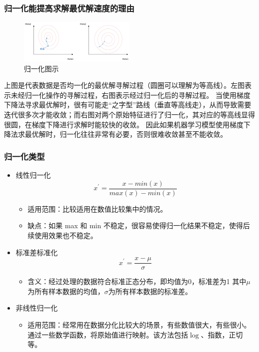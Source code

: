\documentclass[UTF8]{ctexart}
\begin{document}
\subsubsection{归一化能提高求解最优解速度的理由}
\begin{figure}[htb]
	\centering
	\includegraphics[width=0.5\textwidth]{figures/normalization1.png}
	\caption{归一化图示}
	\label{normalization1}
\end{figure}
上图是代表数据是否均一化的最优解寻解过程（圆圈可以理解为等高线）。左图表示未经归一化操作的寻解过程，右图表示经过归一化后的寻解过程。
当使用梯度下降法寻求最优解时，很有可能走“之字型”路线（垂直等高线走），从而导致需要迭代很多次才能收敛；而右图对两个原始特征进行了归一化，其对应的等高线显得很圆，在梯度下降进行求解时能较快的收敛。
因此如果机器学习模型使用梯度下降法求最优解时，归一化往往非常有必要，否则很难收敛甚至不能收敛。
\subsubsection{归一化类型}
\begin{itemize}
	\item 线性归一化 $$x^{\prime} = \frac{x-min(x)}{max(x) - min(x)}$$ \begin{itemize}
		\item 适用范围：比较适用在数值比较集中的情况。
		\item 缺点：如果 max 和 min 不稳定，很容易使得归一化结果不稳定，使得后续使用效果也不稳定。
	\end{itemize}
	\item 标准差标准化 $$x^{\prime} = \frac{x-\mu}{\sigma}$$ \begin{itemize}
		\item 含义：经过处理的数据符合标准正态分布，即均值为0，标准差为1 其中$\mu$为所有样本数据的均值，$\sigma$为所有样本数据的标准差。
	\end{itemize}
	\item 非线性归一化  \begin{itemize}
		\item 适用范围：经常用在数据分化比较大的场景，有些数值很大，有些很小。通过一些数学函数，将原始值进行映射。该方法包括$\log$、指数，正切等。
	\end{itemize}
\end{itemize}
\end{document}
